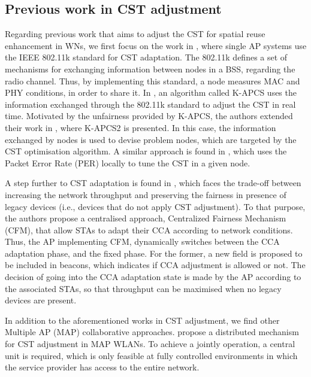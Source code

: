 \documentclass[12pt, a4paper,twoside]{tesi_upf}
\begin{document}
			\subsection{Previous work in CST adjustment}
			\label{section:other_cst}
				Regarding previous work that aims to adjust the CST for spatial reuse enhancement in WNs, we first focus on the work in \cite{thorpe2009ieee802, thorpe2011ieee802}, where single AP systems use the IEEE 802.11k standard \cite{ieee2002ieee} for CST adaptation. The 802.11k defines a set of mechanisms for exchanging information between nodes in a BSS, regarding the radio channel. Thus, by implementing this standard, a node measures MAC and PHY conditions, in order to share it. In \cite{thorpe2009ieee802}, an algorithm called K-APCS uses the information exchanged through the 802.11k standard to adjust the CST in real time. Motivated by the unfairness provided by K-APCS, the authors extended their work in \cite{thorpe2011ieee802}, where K-APCS2 is presented. In this case, the information exchanged by nodes is used to devise problem nodes, which are targeted by the CST optimisation algorithm. A similar approach is found in \cite{zhu2006adaptive}, which uses the Packet Error Rate (PER) locally to tune the CST in a given node. 
				
				A step further to CST adaptation is found in \cite{afifi2016throughput}, which faces the trade-off between increasing the network throughput and preserving the fairness in presence of legacy devices (i.e., devices that do not apply CST adjustment). To that purpose, the authors propose a centralised approach, Centralized Fairness Mechanism (CFM), that allow STAs to adapt their CCA according to network conditions. Thus, the AP implementing CFM, dynamically switches between the CCA adaptation phase, and the fixed phase. For the former, a new field is proposed to be included in beacons, which indicates if CCA adjustment is allowed or not. The decision of going into the CCA adaptation state is made by the AP according to the associated STAs, so that throughput can be maximised when no legacy devices are present.
				
				In addition to the aforementioned works in CST adjustment, we find other Multiple AP (MAP) collaborative approaches. \cite{hua2009cooperative, hua2009distributed} propose a distributed mechanism for CST adjustment in MAP WLANs. To achieve a jointly operation, a central unit is required, which is only feasible at fully controlled environments in which the service provider has access to the entire network.
			
\end{document}
